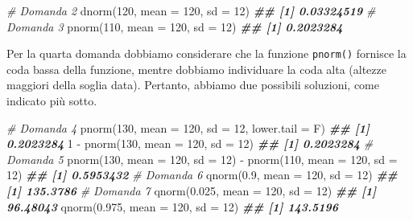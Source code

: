 \documentclass[
  12pt,
]{book}
\newenvironment{Shaded}{\begin{snugshade}}{\end{snugshade}}
\newcommand{\AttributeTok}[1]{\textcolor[rgb]{0.77,0.63,0.00}{#1}}
\newcommand{\CommentTok}[1]{\textcolor[rgb]{0.56,0.35,0.01}{\textit{#1}}}
\newcommand{\DecValTok}[1]{\textcolor[rgb]{0.00,0.00,0.81}{#1}}
\newcommand{\DocumentationTok}[1]{\textcolor[rgb]{0.56,0.35,0.01}{\textbf{\textit{#1}}}}
\newcommand{\FloatTok}[1]{\textcolor[rgb]{0.00,0.00,0.81}{#1}}
\newcommand{\FunctionTok}[1]{\textcolor[rgb]{0.00,0.00,0.00}{#1}}
\newcommand{\NormalTok}[1]{#1}
\newcommand{\SpecialCharTok}[1]{\textcolor[rgb]{0.00,0.00,0.00}{#1}}
\begin{document}
\begin{Shaded}
\begin{Highlighting}[]
\CommentTok{\# Domanda 2}
\FunctionTok{dnorm}\NormalTok{(}\DecValTok{120}\NormalTok{, }\AttributeTok{mean =} \DecValTok{120}\NormalTok{, }\AttributeTok{sd =} \DecValTok{12}\NormalTok{)}
\DocumentationTok{\#\# [1] 0.03324519}
\CommentTok{\# Domanda 3}
\FunctionTok{pnorm}\NormalTok{(}\DecValTok{110}\NormalTok{, }\AttributeTok{mean =} \DecValTok{120}\NormalTok{, }\AttributeTok{sd =} \DecValTok{12}\NormalTok{)}
\DocumentationTok{\#\# [1] 0.2023284}
\end{Highlighting}
\end{Shaded}

Per la quarta domanda dobbiamo considerare che la funzione \texttt{pnorm()} fornisce la coda bassa della funzione, mentre dobbiamo individuare la coda alta (altezze maggiori della soglia data). Pertanto, abbiamo due possibili soluzioni, come indicato più sotto.

\begin{Shaded}
\begin{Highlighting}[]
\CommentTok{\# Domanda 4}
\FunctionTok{pnorm}\NormalTok{(}\DecValTok{130}\NormalTok{, }\AttributeTok{mean =} \DecValTok{120}\NormalTok{, }\AttributeTok{sd =} \DecValTok{12}\NormalTok{, }\AttributeTok{lower.tail =}\NormalTok{ F)}
\DocumentationTok{\#\# [1] 0.2023284}
\DecValTok{1} \SpecialCharTok{{-}} \FunctionTok{pnorm}\NormalTok{(}\DecValTok{130}\NormalTok{, }\AttributeTok{mean =} \DecValTok{120}\NormalTok{, }\AttributeTok{sd =} \DecValTok{12}\NormalTok{)}
\DocumentationTok{\#\# [1] 0.2023284}
\CommentTok{\# Domanda 5}
\FunctionTok{pnorm}\NormalTok{(}\DecValTok{130}\NormalTok{, }\AttributeTok{mean =} \DecValTok{120}\NormalTok{, }\AttributeTok{sd =} \DecValTok{12}\NormalTok{) }\SpecialCharTok{{-}} \FunctionTok{pnorm}\NormalTok{(}\DecValTok{110}\NormalTok{, }\AttributeTok{mean =} \DecValTok{120}\NormalTok{, }\AttributeTok{sd =} \DecValTok{12}\NormalTok{)}
\DocumentationTok{\#\# [1] 0.5953432}
\CommentTok{\# Domanda 6}
\FunctionTok{qnorm}\NormalTok{(}\FloatTok{0.9}\NormalTok{, }\AttributeTok{mean =} \DecValTok{120}\NormalTok{, }\AttributeTok{sd =} \DecValTok{12}\NormalTok{)}
\DocumentationTok{\#\# [1] 135.3786}
\CommentTok{\# Domanda 7}
\FunctionTok{qnorm}\NormalTok{(}\FloatTok{0.025}\NormalTok{, }\AttributeTok{mean =} \DecValTok{120}\NormalTok{, }\AttributeTok{sd =} \DecValTok{12}\NormalTok{)}
\DocumentationTok{\#\# [1] 96.48043}
\FunctionTok{qnorm}\NormalTok{(}\FloatTok{0.975}\NormalTok{, }\AttributeTok{mean =} \DecValTok{120}\NormalTok{, }\AttributeTok{sd =} \DecValTok{12}\NormalTok{)}
\DocumentationTok{\#\# [1] 143.5196}
\end{Highlighting}
\end{Shaded}
\end{document}
